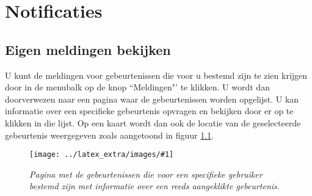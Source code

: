 \documentclass[11pt,twoside,a4paper]{report}
\newcommand*{\copyimageH}[4]{ 			%
	\begin{figure}[Ht]
	\texttt{[image: ../latex\_extra/images/\#1]}
	\caption{\textit{#4}}\label{#2}
	\end{figure}
}
\begin{document}
	\chapter{Notificaties}
	\section{Eigen meldingen bekijken}\label{own_events}
	U kunt de meldingen voor gebeurtenissen die voor u bestemd zijn te zien krijgen door in de menubalk op de knop ``Meldingen"' te klikken. U wordt dan doorverwezen naar een pagina waar de gebeurtenissen worden opgelijst. U kan informatie over een specifieke gebeurtenis opvragen en bekijken door er op te klikken in die lijst. Op een kaart wordt dan ook de locatie van de geselecteerde gebeurtenis weergegeven zoals aangetoond in figuur \ref{events_pge}.
\copyimageH{my_events.jpg}{events_pge}{\textwidth}{Pagina met de gebeurtenissen die voor een specifieke gebruiker bestemd zijn met informatie over een reeds aangeklikte gebeurtenis.}
\end{document}
